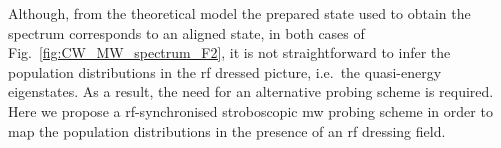 \documentclass[%
reprint,
 amsmath,amssymb,
 aps,
floatfix,
]{revtex4-1}
\newcommand{\TP}[2][red]{\textcolor{#1}{\textit{TP: #2}}}
\begin{document}
Although, from the theoretical model the prepared state used to obtain the spectrum corresponds to an aligned state, in both cases of Fig.~\ref{fig:CW_MW_spectrum_F2},  it is not straightforward to infer the population distributions in the rf dressed picture, i.e.\ the quasi-energy eigenstates. As a result, the need for an alternative probing scheme is required. Here we propose a rf-synchronised stroboscopic mw probing scheme in order to map the population distributions in the presence of an rf dressing field.





\end{document}
